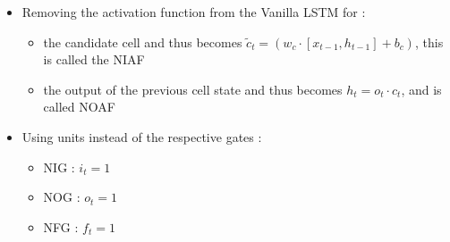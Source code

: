 \begin{itemize}
  \item Removing the activation function from the Vanilla \ac{LSTM} for :
    \begin{itemize}
      \item the candidate cell and thus becomes $ \tilde{c}_t=(w_c\cdot[x_{t-1},h_{t-1}] + b_c) $, this is called the \ac{NIAF}
      \item the output of the previous cell state and thus becomes $ h_t=o_t\cdot c_t $, and is called \ac{NOAF}
    \end{itemize}
  \item Using units instead of the respective gates :
    \begin{itemize}
      \item \ac{NIG} : $i_t=1$
      \item \ac{NOG} : $o_t=1$
      \item \ac{NFG} : $f_t=1$
    \end{itemize}
\end{itemize}
